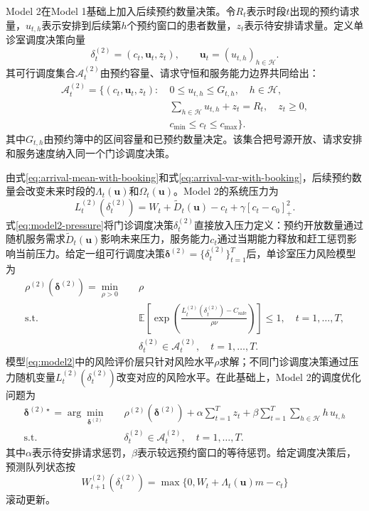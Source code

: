 \documentclass[a4paper,zihao=-4]{ctexart}
\newcommand{\E}{\mathbb{E}}
\numberwithin{figure}{section}
\numberwithin{table}{section}
\begin{document}
Model 2在Model 1基础上加入后续预约数量决策。令$R_t$表示时段$t$出现的预约请求量，$u_{t,h}$表示安排到后续第$h$个预约窗口的患者数量，$z_t$表示待安排请求量。定义单诊室调度决策向量
\begin{equation}
\delta_t^{(2)}=(c_t,\bm u_t,z_t),\qquad
\bm u_t=(u_{t,h})_{h\in\mathcal H}.
\end{equation}
其可行调度集合$\mathcal A_t^{(2)}$由预约容量、请求守恒和服务能力边界共同给出：
\begin{equation}
\begin{aligned}
\mathcal A_t^{(2)}=\bigg\{(c_t,\bm u_t,z_t):\ 
&0\leq u_{t,h}\leq G_{t,h},\quad h\in\mathcal H,\\
&\sum_{h\in\mathcal H}u_{t,h}+z_t=R_t,\quad z_t\geq0,\\
&c_{\min}\leq c_t\leq c_{\max}\bigg\}.
\end{aligned}
\label{eq:single-booking-constraints}
\end{equation}
其中$G_{t,h}$由预约簿中的区间容量和已预约数量决定。该集合把号源开放、请求安排和服务速度纳入同一个门诊调度决策。

由式\eqref{eq:arrival-mean-with-booking}和式\eqref{eq:arrival-var-with-booking}，后续预约数量会改变未来时段的$\Lambda_t(\bm u)$和$\Omega_t(\bm u)$。Model 2的系统压力为
\begin{equation}
L_t^{(2)}(\delta_t^{(2)})
=W_t+\tilde D_t(\bm u)-c_t+\gamma[c_t-c_0]_+^2.
\label{eq:model2-pressure}
\end{equation}
式\eqref{eq:model2-pressure}将门诊调度决策$\delta_t^{(2)}$直接放入压力定义：预约开放数量通过随机服务需求$\tilde D_t(\bm u)$影响未来压力，服务能力$c_t$通过当期能力释放和赶工惩罚影响当前压力。给定一组可行调度决策$\bm\delta^{(2)}=\{\delta_t^{(2)}\}_{t=1}^T$后，单诊室压力风险模型为
\begin{equation}
\begin{aligned}
\rho^{(2)}(\bm\delta^{(2)})
=\min_{\rho>0}\quad
& \rho\\
\mathrm{s.t.}\quad
& \E\left[\exp\left(\frac{L_t^{(2)}(\delta_t^{(2)})-C_{\mathrm{safe}}}{\rho\nu}\right)\right]\leq 1,\quad t=1,\ldots,T,\\
& \delta_t^{(2)}\in\mathcal A_t^{(2)},\quad t=1,\ldots,T.
\end{aligned}
\label{eq:model2}
\end{equation}
模型\eqref{eq:model2}中的风险评价层只针对风险水平$\rho$求解；不同门诊调度决策通过压力随机变量$L_t^{(2)}(\delta_t^{(2)})$改变对应的风险水平。在此基础上，Model 2的调度优化问题为
\begin{equation}
\begin{aligned}
\bm\delta^{(2)\star}
=\arg\min_{\bm\delta^{(2)}}\quad
&\rho^{(2)}(\bm\delta^{(2)})
+\alpha\sum_{t=1}^T z_t
+\beta\sum_{t=1}^T\sum_{h\in\mathcal H}h\,u_{t,h}\\
\mathrm{s.t.}\quad
&\delta_t^{(2)}\in\mathcal A_t^{(2)},\quad t=1,\ldots,T .
\end{aligned}
\label{eq:model2-scheduling}
\end{equation}
其中$\alpha$表示待安排请求惩罚，$\beta$表示较远预约窗口的等待惩罚。给定调度决策后，预测队列状态按
\begin{equation}
W_{t+1}^{(2)}(\delta_t^{(2)})
=\max\{0,W_t+\Lambda_t(\bm u)m-c_t\}
\end{equation}
滚动更新。
\end{document}
